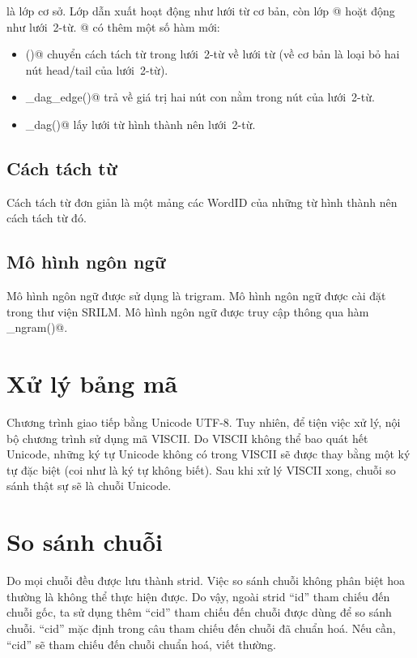\documentclass[a4paper,oneside,14pt]{extbook} %
\begin{document}
\verb@DAG@ là lớp cơ sở. Lớp dẫn xuất \verb@WordDAG@ hoạt động như
lưới từ cơ bản, còn lớp @ hoặt động như lưới~2-từ.
@ có thêm một số hàm mới:
\begin{itemize}
\item \verb@demangle()@ chuyển cách tách từ trong lưới~2-từ về lưới từ
  (về cơ bản là loại bỏ hai nút head/tail của lưới~2-từ).
\item \verb@node_dag_edge()@ trả về giá trị hai nút con nằm trong nút
  của lưới~2-từ.
\item \verb@get_dag()@ lấy lưới từ hình thành nên lưới~2-từ.
\end{itemize}


\subsection{Cách tách từ}

Cách tách từ đơn giản là một mảng các WordID của những từ hình thành
nên cách tách từ đó.

\subsection{Mô hình ngôn ngữ}

Mô hình ngôn ngữ được sử dụng là trigram. Mô hình ngôn ngữ được cài
đặt trong thư viện SRILM. Mô hình ngôn ngữ được truy cập thông qua hàm
\verb@get_ngram()@. 


\section{Xử lý bảng mã}

Chương trình giao tiếp bằng Unicode UTF-8. Tuy nhiên, để tiện việc xử
lý, nội bộ chương trình sử dụng mã VISCII. Do VISCII không thể bao
quát hết Unicode, những ký tự Unicode không có trong VISCII sẽ được
thay bằng một ký tự đặc biệt (coi như là ký tự không biết). Sau khi xử
lý VISCII xong, chuỗi so sánh thật sự sẽ là chuỗi Unicode.

\section{So sánh chuỗi}

Do mọi chuỗi đều được lưu thành strid. Việc so sánh chuỗi không phân biệt 
hoa thường là không thể thực hiện được. Do vậy, ngoài strid ``id'' tham chiếu
đến chuỗi gốc, ta sử dụng thêm ``cid'' tham chiếu đến chuỗi được dùng để
so sánh chuỗi. ``cid'' mặc định trong câu tham chiếu đến chuỗi đã
chuẩn hoá. Nếu cần, ``cid'' sẽ tham chiếu đến chuỗi chuẩn hoá, viết
thường.
\end{document}
